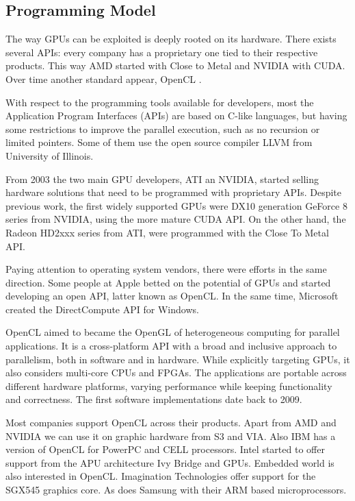 \documentclass[prodmode,acmtecs]{acmsmall}
\begin{document}
\subsection{Programming Model}

The way GPUs can be exploited is deeply rooted on its hardware. There exists several APIs: every company has a proprietary one tied to their respective products. This way AMD started with Close to Metal and NVIDIA with CUDA. Over time another standard appear, OpenCL \cite{opencl}.

With respect to the programming tools available for developers, most the Application Program Interfaces (APIs) are based on C-like languages, but having some restrictions to improve the parallel execution, such as no recursion or limited pointers. Some of them use the open source compiler LLVM \cite{LLVM} from University of Illinois.

From 2003 the two main GPU developers, ATI an NVIDIA, started selling hardware solutions that need to be programmed with proprietary APIs. Despite previous work, the first widely supported GPUs were DX10 generation GeForce 8 series from NVIDIA, using the more mature CUDA API. On the other hand, the Radeon HD2xxx series from ATI, were programmed with the Close To Metal API. 

Paying attention to operating system vendors, there were efforts in the same direction. Some people at Apple betted on the potential of GPUs and started developing an open API, latter known as OpenCL. In the same time, Microsoft created the DirectCompute API for Windows.

OpenCL aimed to became the OpenGL of heterogeneous computing for parallel applications. It is a cross-platform API with a broad and inclusive approach to parallelism, both in software and in hardware. While explicitly targeting GPUs, it also considers multi-core CPUs and FPGAs. The applications are portable across different hardware platforms, varying performance while keeping functionality and correctness. The first software implementations date back to 2009.

Most companies support OpenCL across their products. Apart from AMD and NVIDIA we can use it on graphic hardware from S3 and VIA. Also IBM has a version of OpenCL for PowerPC and CELL processors. Intel started to offer support from the APU architecture Ivy Bridge and GPUs. Embedded world is also interested in OpenCL. Imagination Technologies offer support for the SGX545 graphics core. As does Samsung with their ARM based microprocessors.
\end{document}
